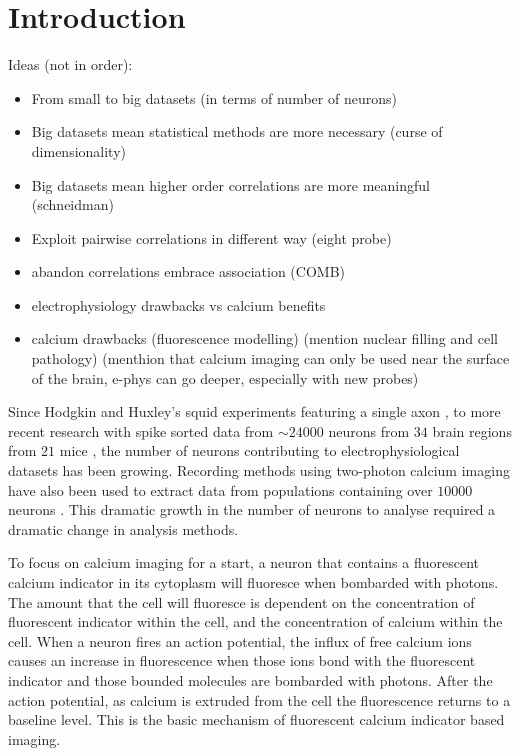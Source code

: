 \section*{Introduction}
Ideas (not in order):
\begin{itemize}
    \item From small to big datasets (in terms of number of neurons)
    \item Big datasets mean statistical methods are more necessary (curse of dimensionality)
    \item Big datasets mean higher order correlations are more meaningful (schneidman)
    \item Exploit pairwise correlations in different way (eight probe)
    \item abandon correlations embrace association (COMB)
    \item electrophysiology drawbacks vs calcium benefits
    \item calcium drawbacks (fluorescence modelling) (mention nuclear filling and cell pathology) (menthion that calcium imaging can only be used near the surface of the brain, e-phys can go deeper, especially with new probes)
\end{itemize}

Since Hodgkin and Huxley's squid experiments featuring a single axon \parencite{hodgkin}, to more recent research with spike sorted data from  $\sim 24000$ neurons from $34$ brain regions from $21$ mice \parencite{allen}, the number of neurons contributing to electrophysiological datasets has been growing. Recording methods using two-photon calcium imaging have also been used to extract data from populations containing over $10000$ neurons \parencite{peron}. This dramatic growth in the number of neurons to analyse required a dramatic change in analysis methods.

To focus on calcium imaging for a start, a neuron that contains a fluorescent calcium indicator in its cytoplasm will fluoresce when bombarded with photons. The amount that the cell will fluoresce is dependent on the concentration of fluorescent indicator within the cell, and the concentration of calcium within the cell. When a neuron fires an action potential, the influx of free calcium ions causes an increase in fluorescence when those ions bond with the fluorescent indicator and those bounded molecules are bombarded with photons. After the action potential, as calcium is extruded from the cell the fluorescence returns to a baseline level. This is the basic mechanism of fluorescent calcium indicator based imaging.


